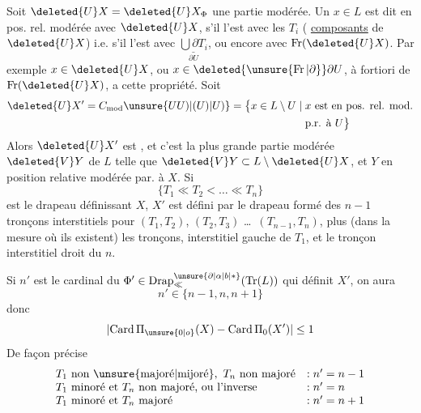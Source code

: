  Soit $\deleted{U}X=\deleted{U}X_{\Phi}$ une partie modérée. Un $x\in L$ est dit en pos. rel. modérée avec $\deleted{U}X$, s'il l'est avec les $T_i$ ( \uline{composants} de $\deleted{U}X$) i.e. s'il l'est avec $\underset{\partial U}{\underline{\bigcup\partial T_i}}$, ou encore avec $\operatorname{Fr}(\deleted{U}X)$.
Par exemple  $x\in\deleted{U}X$, ou $x\in\deleted{\unsure{\operatorname{Fr}|\partial}}\partial U$, à fortiori de $\operatorname{Fr}(\deleted{U}X)$, a cette propriété. Soit
\[
\begin{aligned}
\deleted{U}X'=C_{\mathrm{mod}}\unsure{U U)|(U)|U)}=\bigl\{x\in L\setminus U\mid{}&x\text{ est en pos. rel. mod.}\\
&\text{p.r. à }U\bigr\}
\end{aligned}
\]
Alors  $\deleted{U}X'$ est , et c'est la plus grande partie modérée $\deleted{V}Y$ de $L$ telle que $\deleted{V}Y\subset L\setminus\deleted{U}X$, et $Y$ en position relative modérée par. à $X$. Si
\[
\{T_1\ll T_2<\ldots\ll T_n\}
\]
est le drapeau définissant  $X$, $X'$ est défini par le drapeau formé des $n-1$ tronçons interstitiels  pour $(T_1,T_2)$, $(T_2,T_3)$ \ldots\ $(T_{n-1},T_n)$, plus (dans la mesure où ils existent) les tronçons, interstitiel gauche de $T_1$, et le tronçon interstitiel droit du $n$. 

Si $n'$ est le cardinal du $ {\Phi}'\in\operatorname{Drap}_{\ll}^{\unsure{\partial|\alpha|b|*}}(\operatorname{Tr}(L))$ qui définit $X'$, on aura
\[
n'\in\{n-1,n,n+1\}
\]
donc
\[
\lvert\operatorname{Card}\Pi_{\unsure{0|o}}(X)-\operatorname{Card}\Pi_0(X')\rvert\leq 1
\]
De façon précise
\[\begin{array}{ll}
T_1\ \text{non \unsure{majoré|mijoré}},\ T_n\ \text{non majoré} &: n'=n-1\\
T_1\ \text{minoré et }T_n\ \text{non majoré, ou l'inverse} &: n'=n\\
T_1\ \text{minoré et }T_n\ \text{majoré} &: n'=n+1
\end{array}\]

